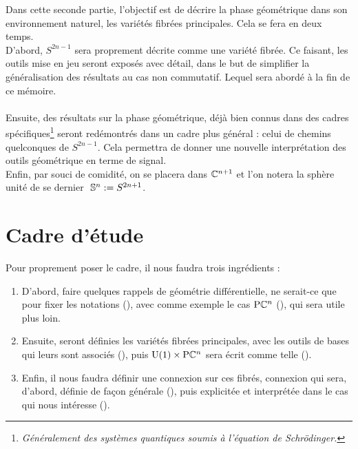 
Dans cette seconde partie, l'objectif est de décrire la phase géométrique dans son environnement naturel, les variétés fibrées principales. Cela se fera en deux temps.
\\
D'abord, $S^{2n-1}$ sera proprement décrite comme une variété fibrée. Ce faisant, les outils mise en jeu seront exposés avec détail, dans le but de simplifier la généralisation des résultats au cas non commutatif. Lequel sera abordé à la fin de ce mémoire.
\\ \\
Ensuite, des résultats sur la phase géométrique, déjà bien connus dans des cadres spécifiques\footnote{\itshape
	Généralement des systèmes quantiques soumis à l'équation de Schrödinger.} 
\cite{berry_quantal_1997, bohm_geometric_2003, mukunda_quantum_1993, chruscinski_geometric_2004} seront redémontrés dans un cadre plus général : celui de chemins quelconques de $S^{2n-1}$. Cela permettra de donner une nouvelle interprétation des outils géométrique en terme de signal.
\\

Enfin, par souci de comidité, on se placera dans $\mathbb{C}^{n+1}$ et l'on notera la sphère unité de se dernier $\ \mathbb{ S}^{n} := S^{2n+1}$.

\section{Cadre d'étude}\label{sec:cadre_geodiff}

Pour proprement poser le cadre, il nous faudra trois ingrédients :
\begin{enumerate}
	
	\item D'abord, faire quelques rappels de géométrie différentielle, ne serait-ce que pour fixer les notations (), avec comme exemple le cas $\text{\normalfont P}\mathbb{C}^{n}$ (), qui sera utile plus loin. 
	
	\item Ensuite, seront définies les variétés fibrées principales, avec les outils de bases qui leurs sont associés (), puis $\text{\normalfont U}(1)\times \text{\normalfont P}\mathbb{C}^{n}$ sera écrit comme telle ().
	
	\item Enfin, il nous faudra définir une connexion sur ces fibrés, connexion qui sera, d'abord, définie de façon générale (), puis explicitée et interprétée dans le cas qui nous intéresse ().
	
\end{enumerate}



